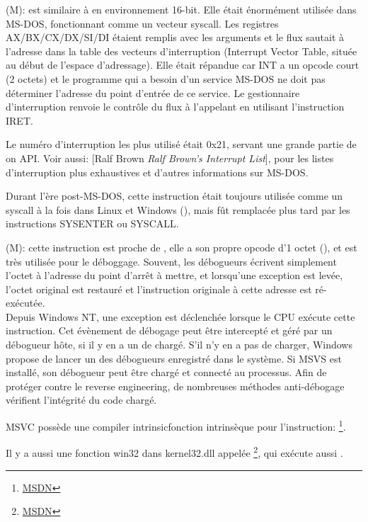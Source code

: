 
\item[INT] (M):  est similaire à 
en environnement 16-bit.
  Elle était énormément utilisée dans MS-DOS, fonctionnant comme un vecteur syscall.
  Les registres AX/BX/CX/DX/SI/DI étaient remplis avec les arguments et le flux sautait
  à l'adresse dans la table des vecteurs d'interruption (Interrupt Vector Table,
  située au début de l'espace d'adressage).
  Elle était répandue car INT a un opcode court (2 octets) et le programme qui a
  besoin d'un service MS-DOS ne doit pas déterminer l'adresse du point d'entrée de
  ce service.
  Le gestionnaire d'interruption renvoie le contrôle du flux à l'appelant en utilisant
  l'instruction IRET.

  Le numéro d'interruption les plus utilisé était 0x21, servant une grande partie
  de on \ac{API}.
  Voir aussi: [Ralf Brown \emph{Ralf Brown's Interrupt List}],
  pour les listes d'interruption plus exhaustives et d'autres informations sur MS-DOS.

  Durant l'ère post-MS-DOS, cette instruction était toujours utilisée comme un syscall
  à la fois dans Linux et Windows (), mais fût remplacée plus tard
  par les instructions SYSENTER ou SYSCALL.

\item[INT 3] (M): cette instruction est proche de
, elle a son propre opcode d'1 octet (),
et est très utilisée pour le déboggage.
Souvent, les débogueurs écrivent simplement l'octet  à l'adresse du point
d'arrêt à mettre, et lorsqu'une exception est levée, l'octet original est restauré
et l'instruction originale à cette adresse est ré-exécutée. \\
Depuis \gls{Windows NT}, une exception  est déclenchée
lorsque le \ac{CPU} exécute cette instruction.
Cet évènement de débogage peut être intercepté et géré par un débogueur hôte, si
il y en a un de chargé.
S'il n'y en a pas de charger, Windows propose de lancer un des débogueurs enregistré
dans le système.
Si \ac{MSVS} est installé, son débogueur peut être chargé et connecté au processus.
Afin de protéger contre le \gls{reverse engineering}, de nombreuses méthodes anti-débogage
vérifient l'intégrité du code chargé.

\ac{MSVC} possède une \gls{compiler intrinsic}{fonction intrinsèque} pour l'instruction:
\footnote{\href{http://go.yurichev.com/17226}{MSDN}}.


Il y a aussi une fonction win32 dans kernel32.dll appelée
\footnote{\href{http://go.yurichev.com/17227}{MSDN}},
qui exécute aussi .

